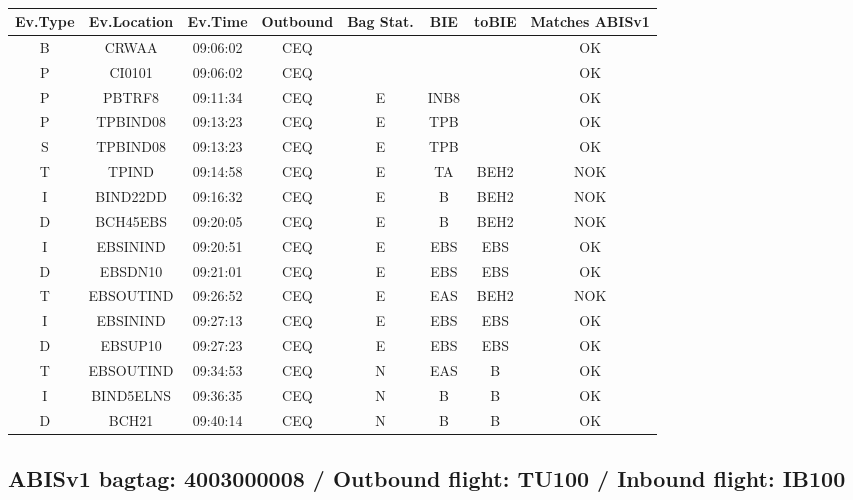 \documentclass{report}
\begin{document}
\paragraph{}
\begin{longtable}{cccccccc}    \toprule
\rowcolor{white!50}
\textbf{Ev.Type} & \textbf{Ev.Location} & \textbf{Ev.Time} & \textbf{Outbound} & \textbf{Bag Stat.} & \textbf{BIE} & \textbf{toBIE} & \textbf{Matches ABISv1} \\\midrule
B & CRWAA & 09:06:02  & CEQ &  &  &  & OK\\
P & CI0101 & 09:06:02  & CEQ &  &  &  & OK\\
P & PBTRF8 & 09:11:34  & CEQ & E & INB8 &  & OK\\
P & TPBIND08 & 09:13:23  & CEQ & E & TPB &  & OK\\
S & TPBIND08 & 09:13:23  & CEQ & E & TPB &  & OK\\
T & TPIND & 09:14:58  & CEQ & E & TA & BEH2 & NOK\\
I & BIND22DD & 09:16:32  & CEQ & E & B & BEH2 & NOK\\
D & BCH45EBS & 09:20:05  & CEQ & E & B & BEH2 & NOK\\
I & EBSININD & 09:20:51  & CEQ & E & EBS & EBS & OK\\
D & EBSDN10 & 09:21:01  & CEQ & E & EBS & EBS & OK\\
T & EBSOUTIND & 09:26:52  & CEQ & E & EAS & BEH2 & NOK\\
I & EBSININD & 09:27:13  & CEQ & E & EBS & EBS & OK\\
D & EBSUP10 & 09:27:23  & CEQ & E & EBS & EBS & OK\\
T & EBSOUTIND & 09:34:53  & CEQ & N & EAS & B & OK\\
I & BIND5ELNS & 09:36:35  & CEQ & N & B & B & OK\\
D & BCH21 & 09:40:14  & CEQ & N & B & B & OK\\
\bottomrule
\end{longtable}
\subsection*{ABISv1 bagtag: 4003000008 / Outbound flight: TU100 / Inbound flight: IB100}
\end{document}
